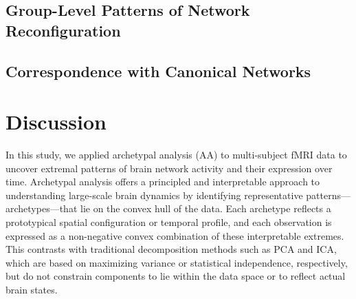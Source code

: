 \documentclass[12pt]{article}
\begin{document}
\subsection*{Group-Level Patterns of Network Reconfiguration}




\subsection*{Correspondence with Canonical Networks}





\section*{Discussion}

In this study, we applied archetypal analysis (AA) to multi-subject fMRI data to uncover extremal patterns of brain network activity and their expression over time. Archetypal analysis offers a principled and interpretable approach to understanding large-scale brain dynamics by identifying representative patterns—archetypes—that lie on the convex hull of the data. Each archetype reflects a prototypical spatial configuration or temporal profile, and each observation is expressed as a non-negative convex combination of these interpretable extremes. This contrasts with traditional decomposition methods such as PCA and ICA, which are based on maximizing variance or statistical independence, respectively, but do not constrain components to lie within the data space or to reflect actual brain states.
\end{document}
